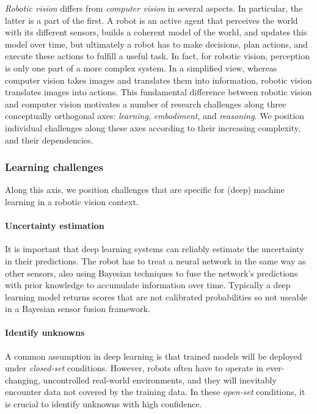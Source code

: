\emph{Robotic vision} differs from \emph{computer vision} in several
aspects. In particular, the latter is a part of the first. A robot is an
active agent that perceives the world with its different sensors, builds
a coherent model of the world, and updates this model over time, but
ultimately a robot has to make decisions, plan actions, and execute
these actions to fulfill a useful task. In fact, for robotic vision,
perception is only one part of a more complex system. In a simplified
view, whereas computer vision takes images and translates them into
information, robotic vision translates images into actions. This
fundamental difference between robotic vision and computer vision
motivates a number of research challenges along three conceptually
orthogonal axes: \emph{learning}, \emph{embodiment}, and
\emph{reasoning}. We position individual challenges along these axes
according to their increasing complexity, and their dependencies.



\subsubsection{Learning challenges}\label{header-n12}

Along this axis, we position challenges that are specific for (deep)
machine learning in a robotic vision context.

\paragraph{Uncertainty estimation}
It is important that deep learning systems can reliably estimate the
uncertainty in their predictions. The robot has to treat a neural
network in the same way as other sensors, also using Bayesian techniques
to fuse the network's predictions with prior knowledge to accumulate
information over time. Typically a deep learning model returns scores
that are not calibrated probabilities so not useable in a Bayesian
sensor fusion framework. 
\paragraph{Identify unknowns}

A common assumption in deep learning is that trained models will be
deployed under \emph{closed-set} conditions. However, robots often have
to operate in ever-changing, uncontrolled real-world environments, and
they will inevitably encounter data not covered by the training data. In
these \emph{open-set} conditions, it is crucial to identify unknowns
with high confidence.
